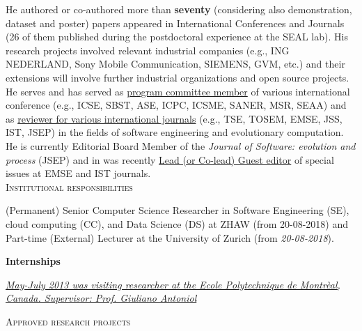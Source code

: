 \documentclass[12pt]{article}
\begin{document}
He authored or co-authored more than \textbf{seventy} (considering also demonstration, dataset 
  and poster) papers appeared in International Conferences and Journals (26 of them published during the postdoctoral experience at the SEAL lab). His research projects involved relevant industrial companies (e.g., ING NEDERLAND, Sony Mobile Communication, SIEMENS, GVM, etc.) and their extensions will involve further industrial organizations and open source projects. He serves and has served as \href{https://spanichella.github.io/\#services}{program committee member} of various international conference (e.g., ICSE, SBST, ASE, ICPC, ICSME, SANER, MSR, SEAA) and as \href{https://spanichella.github.io/\#services}{reviewer for various international journals} (e.g., TSE, TOSEM, EMSE, JSS, IST, JSEP) in the fields of software engineering and evolutionary computation. He is currently Editorial Board Member of the \textit{Journal of Software: evolution and process} (JSEP) and in was recently \href{https://spanichella.github.io/\#services}{Lead (or Co-lead) Guest editor} of special issues at EMSE and IST journals.\\

\vspace{1.5mm}
\textsc{Institutional responsibilities}
\vspace{1.5mm}

(Permanent) Senior Computer Science Researcher in Software Engineering (SE), cloud computing (CC), and Data Science (DS) at ZHAW (from 20-08-2018) and Part-time (External) Lecturer at the University of Zurich (from \textit{20-08-2018}).

\vspace{2.5mm}
\textbf{Internships}
\begin{innerlist}
   \item \emph{
              \href{http://www.polymtl.ca/‎}
                   {May-July 2013 was visiting researcher at the Ecole Polytechnique de Montr\`{e}al, Canada. Supervisor: Prof. Giuliano Antoniol}}
\end{innerlist}
\vspace{5.5mm}

\textsc{Approved research projects}
\vspace{1.5mm}
\end{document}
